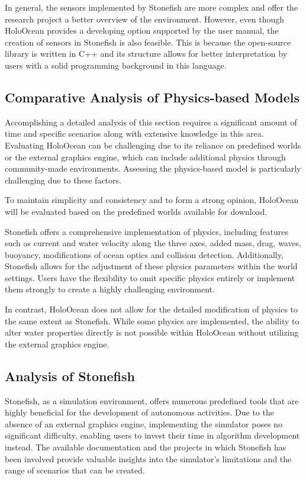 \documentclass[]{article}
\begin{document}
	In general, the sensors implemented by Stonefish are more complex and offer the research project a better overview of the environment. However, even though HoloOcean provides a developing option supported by the user manual, the creation of sensors in Stonefish is also feasible. This is because the open-source library is written in C++ and its structure allows for better interpretation by users with a solid programming background in this language.
	
	\subsection{Comparative Analysis of Physics-based Models}
	
	Accomplishing a detailed analysis of this section requires a significant amount of time and specific scenarios along with extensive knowledge in this area. Evaluating HoloOcean can be challenging due to its reliance on predefined worlds or the external graphics engine, which can include additional physics through community-made environments. Assessing the physics-based model is particularly challenging due to these factors.
	
	To maintain simplicity and consistency and to form a strong opinion, HoloOcean will be evaluated based on the predefined worlds available for download.
	
	Stonefish offers a comprehensive implementation of physics, including features such as current and water velocity along the three axes, added mass, drag, waves, buoyancy, modifications of ocean optics and collision detection. Additionally, Stonefish allows for the adjustment of these physics parameters within the world settings. Users have the flexibility to omit specific physics entirely or implement them strongly to create a highly challenging environment.
	
	In contrast, HoloOcean does not allow for the detailed modification of physics to the same extent as Stonefish. While some physics are implemented, the ability to alter water properties directly is not possible within HoloOcean without utilizing the external graphics engine.
	
	
	\subsection{Analysis of Stonefish} 
	
	Stonefish, as a simulation environment, offers numerous predefined tools that are highly beneficial for the development of autonomous activities. Due to the absence of an external graphics engine, implementing the simulator poses no significant difficulty, enabling users to invest their time in algorithm development instead. The available documentation and the projects in which Stonefish has been involved provide valuable insights into the simulator's limitations and the range of scenarios that can be created.
	
\end{document}
